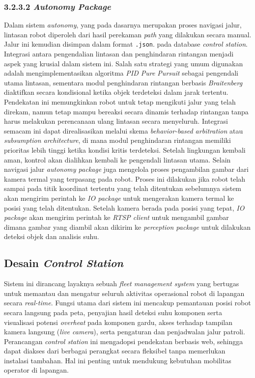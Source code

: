 \subsubsection{3.2.3.2 \emph{Autonomy Package}}
Dalam sistem \emph{autonomy}, yang pada dasarnya merupakan proses navigasi jalur, lintasan robot diperoleh dari hasil perekaman \emph{path} yang dilakukan secara manual. Jalur ini kemudian disimpan dalam format \texttt{.json}. pada database \emph{control station}. Integrasi antara pengendalian lintasan dan penghindaran rintangan menjadi aspek yang krusial dalam sistem ini. Salah satu strategi yang umum digunakan adalah mengimplementasikan algoritma \emph{PID Pure Pursuit} sebagai pengendali utama lintasan, sementara modul penghindaran rintangan berbasis \emph{Braitenberg} diaktifkan secara kondisional ketika objek terdeteksi dalam jarak tertentu. Pendekatan ini memungkinkan robot untuk tetap mengikuti jalur yang telah direkam, namun tetap mampu bereaksi secara dinamis terhadap rintangan tanpa harus melakukan perencanaan ulang lintasan secara menyeluruh. Integrasi semacam ini dapat direalisasikan melalui skema \emph{behavior-based arbitration} atau \emph{subsumption architecture}, di mana modul penghindaran rintangan memiliki prioritas lebih tinggi ketika kondisi kritis terdeteksi. Setelah lingkungan kembali aman, kontrol akan dialihkan kembali ke pengendali lintasan utama. Selain navigasi jalur \emph{autonomy package} juga mengelola proses pengambilan gambar dari kamera termal yang terpasang pada robot. Proses ini dilakukan jika robot telah sampai pada titik koordinat tertentu yang telah ditentukan sebelumnya sistem akan mengirim perintah ke \emph{IO package} untuk mengerakan kamera termal ke posisi yang telah ditentukan. Setelah kamera berada pada posisi yang tepat, \emph{IO package} akan mengirim perintah ke \emph{RTSP client} untuk mengambil gambar dimana gambar yang diambil akan dikirim ke \emph{perception package} untuk dilakukan deteksi objek dan analisis suhu. 

\subsection{Desain \textit{Control Station}}

Sistem ini dirancang layaknya sebuah \emph{fleet management system} yang bertugas untuk memantau dan mengatur seluruh aktivitas operasional robot di lapangan secara \emph{real-time}. Fungsi utama dari sistem ini mencakup pemantauan posisi robot secara langsung pada peta, penyajian hasil deteksi suhu komponen serta visualisasi potensi \emph{overheat} pada komponen gardu, akses terhadap tampilan kamera langsung (\emph{live camera}), serta pengaturan dan penjadwalan jalur patroli. Perancangan \emph{control station} ini mengadopsi pendekatan berbasis web, sehingga dapat diakses dari berbagai perangkat secara fleksibel tanpa memerlukan instalasi tambahan. Hal ini penting untuk mendukung kebutuhan mobilitas operator di lapangan. 

